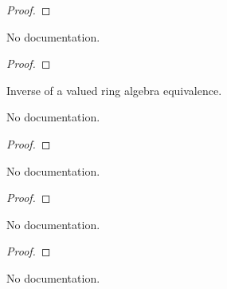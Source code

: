 \begin{proof}
    \leanok
\end{proof}

\begin{theorem}\label{ValRingEquiv.refl_toEquiv}
        \leanok
                No documentation.
    \end{theorem}

\begin{proof}
    \leanok
\end{proof}

\begin{definition}\label{ValAlgEquiv.symm}
        \leanok
                Inverse of a valued ring algebra equivalence.
    \end{definition}

\begin{theorem}\label{ValAlgEquiv.apply_symm_apply}
        \leanok
                No documentation.
    \end{theorem}

\begin{proof}
    \leanok
\end{proof}

\begin{theorem}\label{ValAlgEquiv.symm_apply_apply}
        \leanok
                No documentation.
    \end{theorem}

\begin{proof}
    \leanok
\end{proof}

\begin{theorem}\label{ValRingEquiv.symm_refl}
        \leanok
                No documentation.
    \end{theorem}

\begin{proof}
    \leanok
\end{proof}

\begin{theorem}\label{ValRingEquiv.apply_eq_iff_eq_symm_apply}
        \leanok
                No documentation.
    \end{theorem}

